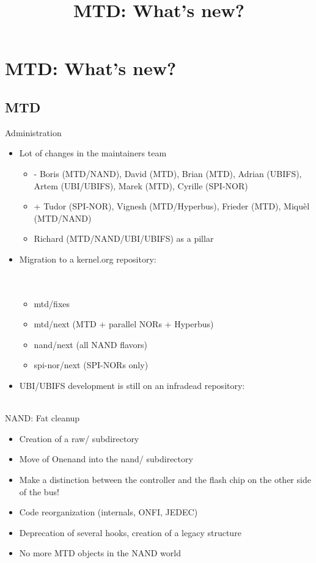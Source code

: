 \documentclass[aspectratio=169,obeyspaces,spaces,hyphens,dvipsnames]{beamer}
\title{MTD: What's new?}
\institute{Bootlin \hfill Sigma-star GmbH}
\begin{document}
\section{MTD: What's new?}

\subsection{MTD}

\begin{frame}{Administration}
  \begin{itemize}
  \item Lot of changes in the maintainers team
    \begin{itemize}
    \item - Boris (MTD/NAND), David (MTD), Brian (MTD), Adrian
      (UBIFS), Artem (UBI/UBIFS), Marek (MTD), Cyrille (SPI-NOR)
    \item + Tudor (SPI-NOR), Vignesh (MTD/Hyperbus), Frieder (MTD),
      Miquèl (MTD/NAND)
    \item Richard (MTD/NAND/UBI/UBIFS) as a pillar
    \end{itemize}
  \item Migration to a kernel.org repository:\\
    \sout{}\\
    \\
    \begin{itemize}
    \item mtd/fixes
    \item mtd/next (MTD + parallel NORs + Hyperbus)
    \item nand/next (all NAND flavors)
    \item spi-nor/next (SPI-NORs only)
    \end{itemize}
  \item UBI/UBIFS development is still on an infradead repository:\\
    \\
  \end{itemize}
\end{frame}

\begin{frame}{NAND: Fat cleanup}
  \begin{itemize}
  \item Creation of a raw/ subdirectory
  \item Move of Onenand into the nand/ subdirectory
  \item Make a distinction between the controller and the flash chip on
    the other side of the bus!
  \item Code reorganization (internals, ONFI, JEDEC)
  \item Deprecation of several hooks, creation of a legacy structure
  \item No more MTD objects in the NAND world
  \end{itemize}
\end{frame}
\end{document}
